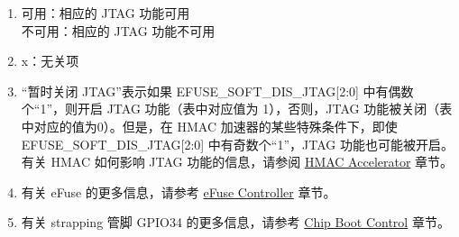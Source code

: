 \begin{tiplisting}
\vspace{-2em}
\begin{enumerate}
\item \label{JTAG footnote: 1}
    可用：相应的 JTAG 功能可用\\
    不可用：相应的 JTAG 功能不可用
\item \label{JTAG footnote: 2}
    x：无关项
\item \label{JTAG footnote: 3}
    “暂时关闭 JTAG”表示如果 EFUSE\_SOFT\_DIS\_JTAG[2:0] 中有偶数个“1”，则开启 JTAG 功能（表中对应值为 1），否则，JTAG 功能被关闭（表中对应的值为0）。但是，在\chipname{} HMAC 加速器的某些特殊条件下，即使 EFUSE\_SOFT\_DIS\_JTAG[2:0] 中有奇数个“1”，JTAG 功能也可能被开启。
    有关 HMAC 如何影响 JTAG 功能的信息，请参阅 \hyperref[mod:hmac]{HMAC Accelerator} 章节。
\item \label{JTAG footnote: 4}
    有关 eFuse 的更多信息，请参考 \hyperref[mod:efuse]{eFuse Controller} 章节。
\item \label{JTAG footnote: 5}
    有关 strapping 管脚 GPIO34 的更多信息，请参考 \hyperref[mod:bootctrl]{Chip Boot Control} 章节。
\end{enumerate}
\end{tiplisting}
